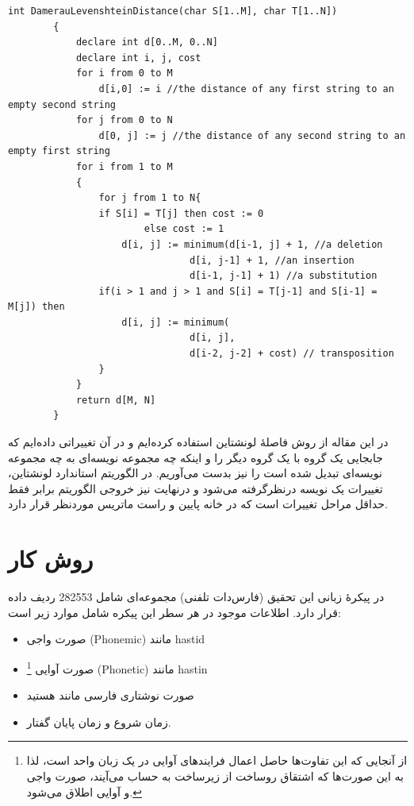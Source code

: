 \documentclass[12pt,onecolumn,a4paper]{article}
\begin{document}
    \begin{LTR}
        \begin{lstlisting}[style=C++Style,caption=\rl{فاصلۀ دامرو-لونشتاین}, label={listing:3}]
        int DamerauLevenshteinDistance(char S[1..M], char T[1..N])
        {
            declare int d[0..M, 0..N]
            declare int i, j, cost
            for i from 0 to M
                d[i,0] := i //the distance of any first string to an empty second string
            for j from 0 to N
                d[0, j] := j //the distance of any second string to an empty first string
            for i from 1 to M
            {
                for j from 1 to N{
                if S[i] = T[j] then cost := 0
                        else cost := 1
                    d[i, j] := minimum(d[i-1, j] + 1, //a deletion
                                d[i, j-1] + 1, //an insertion
                                d[i-1, j-1] + 1) //a substitution
                if(i > 1 and j > 1 and S[i] = T[j-1] and S[i-1] = M[j]) then
                    d[i, j] := minimum(
                                d[i, j],
                                d[i-2, j-2] + cost) // transposition
                }
            }
            return d[M, N]
        }
        \end{lstlisting}
    \end{LTR}

    \par
    در این مقاله از روش فاصلۀ لونشتاین استفاده کرده‌ایم و در آن تغییراتی داده‌ایم که جابجایی یک گروه با یک گروه دیگر را و اینکه چه مجموعه نویسه‌ای به چه مجموعه نویسه‌ای تبدیل شده‌ است را نیز بدست می‌آوریم. در الگوریتم استاندارد لونشتاین، تغییرات یک نویسه درنظرگرفته می‌شود و درنهایت نیز خروجی الگوریتم برابر فقط حداقل مراحل تغییرات است که در خانه پایین و راست ماتریس موردنظر قرار دارد.

    \section{روش کار}
    در پیکرهٔ زبانی این تحقیق (فارس‌دات تلفنی) مجموعه‌ای شامل 282553 ردیف داده قرار دارد. اطلاعات موجود در هر سطر این پیکره شامل موارد زیر است:

    \begin{itemize}
        \item صورت واجی (Phonemic) مانند hastid
        \item صورت آوایی \footnote{از آنجایی که این تفاوت‌ها حاصل اعمال فرایندهای آوایی در یک زبان واحد است، لذا به این صورت‌ها که اشتقاق روساخت از زیرساخت به حساب می‌آیند، صورت واجی و آوایی اطلاق می‌شود.} (Phonetic) مانند hastin
        \item صورت نوشتاری فارسی مانند هستید
        \item زمان شروع و زمان پایان گفتار.
    \end{itemize}
\end{document}
